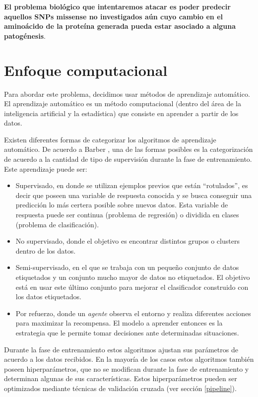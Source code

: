 \textbf{El problema biológico que intentaremos atacar es poder predecir aquellos SNPs missense no investigados aún cuyo cambio en el aminoácido de la proteína generada pueda estar asociado a alguna patogénesis}. 

\section{Enfoque computacional}

Para abordar este problema, decidimos usar métodos de aprendizaje automático. El aprendizaje automático es un método computacional (dentro del área de la inteligencia artificial y la estadística) que consiste en aprender a partir de los datos. 

Existen diferentes formas de categorizar los algoritmos de aprendizaje automático. De acuerdo a Barber \cite{Barber2011}, una de las formas posibles es la categorización de acuerdo a la cantidad de tipo de supervisión durante la fase de entrenamiento. Este aprendizaje puede ser:

\begin{itemize}
\item Supervisado, en donde se utilizan ejemplos previos que están ``rotulados'', es decir que poseen una variable de respuesta conocida y se busca conseguir una predicción lo más certera posible sobre nuevos datos. Esta variable de respuesta puede ser continua (problema de regresión) o dividida en clases (problema de clasificación). 
\item No supervisado, donde el objetivo es encontrar distintos grupos o clusters dentro de los datos.
\item Semi-supervisado, en el que se trabaja con un pequeño conjunto de datos etiquetados y un conjunto mucho mayor de datos no etiquetados. El objetivo está en usar este último conjunto para mejorar el clasificador construido con los datos etiquetados.
\item Por refuerzo, donde un \textit{agente} observa el entorno y realiza diferentes acciones para maximizar la recompensa. El modelo a aprender entonces es la estrategia que le permite tomar decisiones ante determinadas situaciones. 
\end{itemize}

Durante la fase de entrenamiento estos algoritmos ajustan sus parámetros de acuerdo a los datos recibidos. En la mayoría de los casos estos algoritmos también poseen hiperparámetros, que no se modifican durante la fase de entrenamiento y determinan algunas de sus características. Estos hiperparámetros pueden ser optimizados mediante técnicas de validación cruzada (ver sección \ref{pipeline}). 

